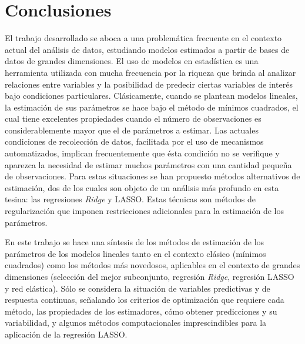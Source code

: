 \documentclass[a4paper,12pt]{report}
\begin{document}
\chapter{Conclusiones}
El trabajo desarrollado se aboca a una problemática frecuente en el contexto actual del análisis de datos, estudiando modelos estimados a partir de bases de datos de grandes dimensiones. El uso de modelos en estadística es una herramienta utilizada con mucha frecuencia por la riqueza que brinda al analizar relaciones entre variables y la posibilidad de predecir ciertas variables de interés bajo condiciones particulares. Clásicamente, cuando se plantean modelos lineales, la estimación de sus parámetros se hace bajo el método de mínimos cuadrados, el cual tiene excelentes propiedades cuando el número de observaciones es considerablemente mayor que el de parámetros a estimar. Las actuales condiciones de recolección de datos, facilitada por el uso de mecanismos automatizados, implican frecuentemente que ésta condición no se verifique y aparezca la necesidad de estimar muchos parámetros con una cantidad pequeña de observaciones. Para estas situaciones se han propuesto métodos alternativos de estimación, dos de los cuales son objeto de un análisis más profundo en esta tesina: las regresiones \textit{Ridge} y LASSO. Estas técnicas son métodos de regularización que imponen restricciones adicionales para la estimación de los parámetros.

En este trabajo se hace una síntesis de los métodos de estimación de los parámetros de los modelos lineales tanto en el contexto clásico (mínimos cuadrados) como los métodos más novedosos, aplicables en el contexto de grandes dimensiones (selección del mejor subconjunto, regresión \textit{Ridge}, regresión LASSO y red elástica). Sólo se considera la situación de variables predictivas y de respuesta continuas, señalando los criterios de optimización que requiere cada método, las propiedades de los estimadores, cómo obtener predicciones y su variabilidad, y algunos métodos computacionales imprescindibles para la aplicación de la regresión LASSO.
 
\end{document}
